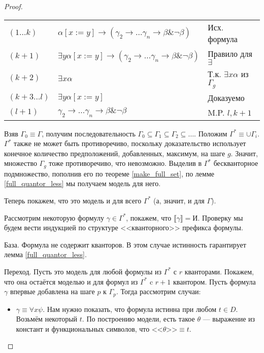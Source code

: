 \begin{proof}
\begin{itemize}
\begin{tabular}{lll}
$(1 \dots k)$ & $\alpha [x := y] \rightarrow (\gamma_2 \rightarrow \dots \gamma_n \rightarrow \beta \& \neg \beta)$ & Исх. формула\\
$(k+1)$ & $\exists y \alpha [x := y] \rightarrow (\gamma_2 \rightarrow \dots \gamma_n \rightarrow \beta \& \neg \beta)$ & Правило для $\exists$\\
$(k+2)$ & $\exists x \alpha$ & Т.к. $\exists x \alpha$ из $\Gamma_g$ \\
$(k+3 \dots l)$ & $\exists y \alpha [x := y]$ & Доказуемо \\
$(l+1)$ & $\gamma_2 \rightarrow \dots \gamma_n \rightarrow \beta \& \neg \beta$ & M.P. $l, k+1$
\end{tabular}

\end{itemize}

Взяв $\Gamma_0 \equiv \Gamma$, получим последовательность
$\Gamma_0 \subseteq \Gamma_1 \subseteq \Gamma_2 \subseteq \dots$. Положим
$\Gamma^* \equiv \cup \Gamma_i$.
$\Gamma^*$ также не может быть противоречиво, поскольку доказательство
использует конечное количество предположений, добавленных, максимум, на шаге $g$. Значит,
множество $\Gamma_g$ тоже противоречиво, что невозможно.
Выделив в $\Gamma^*$ бескванторное подмножество, 
пополнив его по теореме \ref{make_full_set}, по лемме \ref{full_quantor_less}
мы получаем модель для него.

Теперь покажем, что это модель и для всего $\Gamma^*$ (а, значит, и для $\Gamma$).

Рассмотрим некоторую формулу $\gamma \in \Gamma^*$,
покажем, что $\llbracket \gamma \rrbracket = \texttt{И}$.
Проверку мы будем вести индукцией по структуре <<кванторного>> префикса формулы. 

База. Формула не содержит кванторов. В этом случае истинность гарантирует лемма
\ref{full_quantor_less}. 

Переход. Пусть это модель для любой формулы из $\Gamma^*$ с $r$ кванторами.
Покажем, что она остаётся моделью и для формул из $\Gamma^*$ c $r+1$ квантором.
Пусть формула $\gamma$ впервые добавлена на шаге $p$ к $\Gamma_p$. 
Тогда рассмотрим случаи:

\begin{itemize}
\item $\gamma \equiv \forall x \psi$. 
Нам нужно показать, что формула истинна при любом $t \in D$. 
Возьмём некоторый $t$. По построению модели, есть такое $\theta$ ---
выражение из констант и функциональных символов, что 
$\texttt{<<} \theta \texttt{>>} \equiv t$. 


\end{itemize}
\end{proof}
